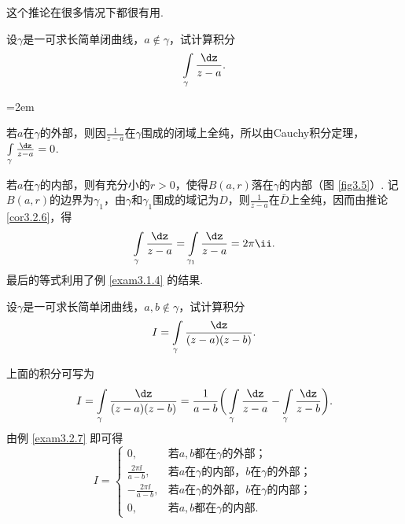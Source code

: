 这个推论在很多情况下都很有用.
\begin{example}\label{exam3.2.7}
设$\gamma$是一可求长简单闭曲线，$a\not\in\gamma$，试计算积分
\[\int\limits_\gamma\frac{\dz}{z-a}.\]
\end{example}
\noindent\begin{minipage}[b]{0.7\textwidth}\parindent=2em
\begin{solution}
  若$a$在$\gamma$的外部，则因$\frac1{z-a}$在$\gamma$围成的闭域上全纯，所以由Cauchy积分定理，$\int\limits_\gamma\frac{\dz}{z-a}=0$.

若$a$在$\gamma$的内部，则有充分小的$r>0$，使得$B(a,r)$落在$\gamma$的内部（图 \ref{fig3.5}）. 记$B(a,r)$的边界为$\gamma_1$，由$\gamma$和$\gamma_1$围成的域记为$D$，则$\frac1{z-a}$在$\bar D$上全纯，因而由推论 \ref{cor3.2.6}，得
\[\int\limits_\gamma\frac{\dz}{z-a}=\int\limits_{\gamma_1}\frac{\dz}{z-a}=2\pi\ii.\]
最后的等式利用了例 \ref{exam3.1.4} 的结果.
\end{solution}
\end{minipage}
\begin{minipage}[b]{0.3\textwidth}
\centering
{}
\end{minipage}

\begin{example}\label{exam3.2.8}
设$\gamma$是一可求长简单闭曲线，$a,b\notin\gamma$，试计算积分
\[I=\int\limits_\gamma\frac{\dz}{(z-a)(z-b)}.\]
\end{example}
\begin{solution}
上面的积分可写为
\[
I=\int\limits_\gamma\frac{\dz}{(z-a)(z-b)}=
\frac1{a-b}\bigg(\int\limits_\gamma\frac{\dz}{z-a}
-\int\limits_\gamma\frac{\dz}{z-b}\bigg).
\]
由例 \ref{exam3.2.7} 即可得
\begin{equation*}
I=
\begin{cases}
0,                     &\mbox{若$a,b$都在$\gamma$的外部；}\\
\frac{2\pi\ii}{a-b},   &\mbox{若$a$在$\gamma$的内部，$b$在$\gamma$的外部；}\\
-\frac{2\pi\ii}{a-b},  &\mbox{若$a$在$\gamma$的外部，$b$在$\gamma$的内部；}\\
0,                     &\mbox{若$a,b$都在$\gamma$的内部.}
\end{cases}
\end{equation*}
\end{solution}

